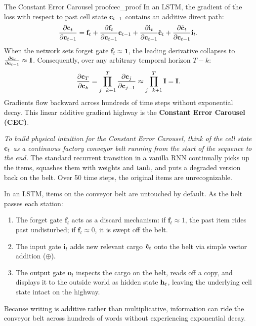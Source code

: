 \documentclass[../../main.tex]{subfiles}
\begin{document}
\begin{theorem}{The Constant Error Carousel proof}{cec_proof}
In an LSTM, the gradient of the loss with respect to past cell state $\mathbf{c}_{t-1}$ contains an additive direct path:
\begin{equation}
\label{eq:cec_gradient}
\frac{\partial \mathbf{c}_t}{\partial \mathbf{c}_{t-1}} = \mathbf{f}_t + \frac{\partial \mathbf{f}_t}{\partial \mathbf{c}_{t-1}} \mathbf{c}_{t-1} + \frac{\partial \mathbf{i}_t}{\partial \mathbf{c}_{t-1}} \tilde{\mathbf{c}}_t + \frac{\partial \tilde{\mathbf{c}}_t}{\partial \mathbf{c}_{t-1}} \mathbf{i}_t.
\end{equation}
When the network sets forget gate $\mathbf{f}_t \approx \mathbf{1}$, the leading derivative collapses to $\frac{\partial \mathbf{c}_t}{\partial \mathbf{c}_{t-1}} \approx \mathbf{I}$. Consequently, over any arbitrary temporal horizon $T - k$:
\begin{equation}
\label{eq:cec_chain}
\frac{\partial \mathbf{c}_T}{\partial \mathbf{c}_k} = \prod_{j=k+1}^T \frac{\partial \mathbf{c}_j}{\partial \mathbf{c}_{j-1}} \approx \prod_{j=k+1}^T \mathbf{I} = \mathbf{I}.
\end{equation}
Gradients flow backward across hundreds of time steps without exponential decay. This linear additive gradient highway is the \textbf{Constant Error Carousel (CEC)}.
\end{theorem}


\textit{To build physical intuition for the Constant Error Carousel, think of the cell state $\mathbf{c}_t$ as a continuous factory conveyor belt running from the start of the sequence to the end.} The standard recurrent transition in a vanilla RNN continually picks up the items, squashes them with weights and $\tanh$, and puts a degraded version back on the belt. Over 50 time steps, the original items are unrecognizable.

In an LSTM, items on the conveyor belt are untouched by default. As the belt passes each station:
\begin{enumerate}
    \item The forget gate $\mathbf{f}_t$ acts as a discard mechanism: if $\mathbf{f}_t \approx 1$, the past item rides past undisturbed; if $\mathbf{f}_t \approx 0$, it is swept off the belt.
    \item The input gate $\mathbf{i}_t$ adds new relevant cargo $\tilde{\mathbf{c}}_t$ onto the belt via simple vector addition ($\oplus$).
    \item The output gate $\mathbf{o}_t$ inspects the cargo on the belt, reads off a copy, and displays it to the outside world as hidden state $\mathbf{h}_t$, leaving the underlying cell state intact on the highway.
\end{enumerate}
Because writing is additive rather than multiplicative, information can ride the conveyor belt across hundreds of words without experiencing exponential decay.
\end{document}
